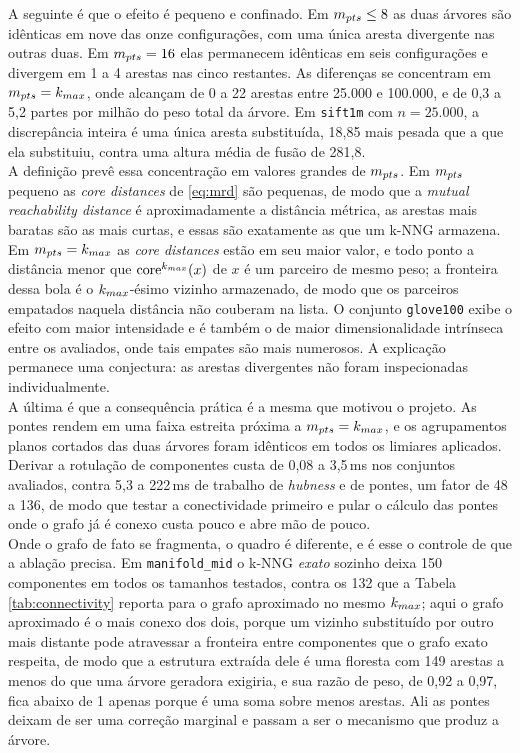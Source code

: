 A seguinte é que o efeito é pequeno e confinado. Em $m_{pts} \leq 8$ as duas árvores são idênticas em nove das onze configurações, com uma única aresta divergente nas outras duas. Em $m_{pts} = 16$ elas permanecem idênticas em seis configurações e divergem em 1 a 4 arestas nas cinco restantes. As diferenças se concentram em $m_{pts} = k_{max}$, onde alcançam de 0 a 22 arestas entre 25.000 e 100.000, e de 0,3 a 5,2 partes por milhão do peso total da árvore. Em \texttt{sift1m} com $n = 25.000$, a discrepância inteira é uma única aresta substituída, 18,85 mais pesada que a que ela substituiu, contra uma altura média de fusão de 281,8.\\

A definição prevê essa concentração em valores grandes de $m_{pts}$. Em $m_{pts}$ pequeno as \textit{core distances} de \eqref{eq:mrd} são pequenas, de modo que a \textit{mutual reachability distance} é aproximadamente a distância métrica, as arestas mais baratas são as mais curtas, e essas são exatamente as que um \ac{k-NNG} armazena. Em $m_{pts} = k_{max}$ as \textit{core distances} estão em seu maior valor, e todo ponto a distância menor que $\mathrm{core}^{k_{max}}(x)$ de $x$ é um parceiro de mesmo peso; a fronteira dessa bola é o $k_{max}$-ésimo vizinho armazenado, de modo que os parceiros empatados naquela distância não couberam na lista. O conjunto \texttt{glove100} exibe o efeito com maior intensidade e é também o de maior dimensionalidade intrínseca entre os avaliados, onde tais empates são mais numerosos. A explicação permanece uma conjectura: as arestas divergentes não foram inspecionadas individualmente.\\

A última é que a consequência prática é a mesma que motivou o projeto. As pontes rendem em uma faixa estreita próxima a $m_{pts} = k_{max}$, e os agrupamentos planos cortados das duas árvores foram idênticos em todos os limiares aplicados. Derivar a rotulação de componentes custa de 0,08 a 3,5\,ms nos conjuntos avaliados, contra 5,3 a 222\,ms de trabalho de \textit{hubness} e de pontes, um fator de 48 a 136, de modo que testar a conectividade primeiro e pular o cálculo das pontes onde o grafo já é conexo custa pouco e abre mão de pouco.\\

Onde o grafo de fato se fragmenta, o quadro é diferente, e é esse o controle de que a ablação precisa. Em \texttt{manifold\_mid} o \ac{k-NNG} \textit{exato} sozinho deixa 150 componentes em todos os tamanhos testados, contra os 132 que a Tabela \ref{tab:connectivity} reporta para o grafo aproximado no mesmo $k_{max}$; aqui o grafo aproximado é o mais conexo dos dois, porque um vizinho substituído por outro mais distante pode atravessar a fronteira entre componentes que o grafo exato respeita, de modo que a estrutura extraída dele é uma floresta com 149 arestas a menos do que uma árvore geradora exigiria, e sua razão de peso, de 0,92 a 0,97, fica abaixo de 1 apenas porque é uma soma sobre menos arestas. Ali as pontes deixam de ser uma correção marginal e passam a ser o mecanismo que produz a árvore.\\

